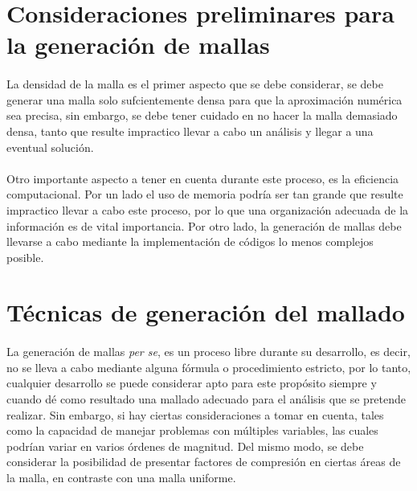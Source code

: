 \documentclass[letterpaper, openright, 12pt]{book}
\begin{document}
	\section{Consideraciones preliminares para la generación de mallas}	
		\paragraph*{}
			La densidad de la malla es el primer aspecto que se debe considerar, se debe generar una malla solo sufcientemente densa para que la aproximación numérica sea precisa, sin embargo, se debe tener cuidado en no hacer la malla demasiado densa, tanto que resulte impractico llevar a cabo un análisis y llegar a una eventual solución.
		\paragraph{}
			 Otro importante aspecto a tener en cuenta durante este proceso, es la eficiencia computacional. Por un lado el uso de memoria podría ser tan grande que resulte impractico llevar a cabo este proceso, por lo que una organización adecuada de la información es de vital importancia. Por otro lado, la generación de mallas debe llevarse a cabo mediante la implementación de códigos lo menos complejos posible.
			
	\section{Técnicas de generación del mallado}
		\paragraph*{}
			La generación de mallas \textit{per se}, es un proceso libre durante su desarrollo, es decir, no se lleva a cabo mediante alguna fórmula o procedimiento estricto, por lo tanto, cualquier desarrollo se puede considerar apto para este propósito siempre y cuando dé como resultado una mallado adecuado para el análisis que se pretende realizar. Sin embargo, si hay ciertas consideraciones a tomar en cuenta, tales como la capacidad de manejar problemas con múltiples variables, las cuales podrían variar en varios órdenes de magnitud. Del mismo modo, se debe considerar la posibilidad de presentar factores de compresión en ciertas áreas de la malla, en contraste con una malla uniforme.
			
\end{document}
